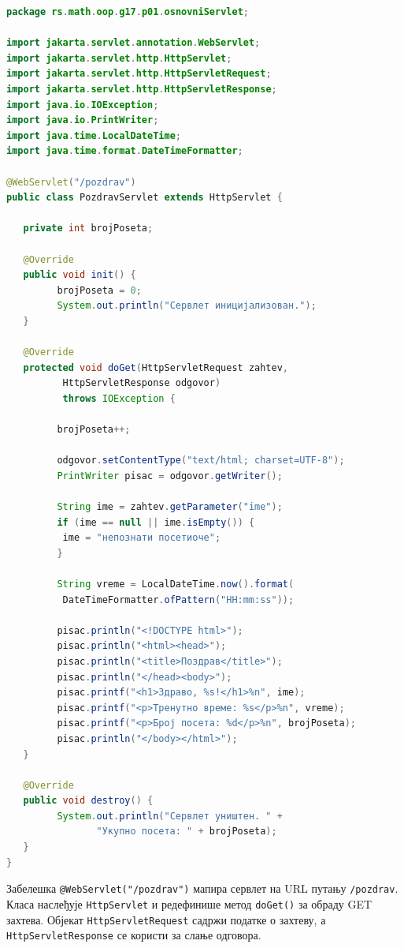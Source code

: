 \begin{lstlisting}[language=Java]
package rs.math.oop.g17.p01.osnovniServlet;
 
import jakarta.servlet.annotation.WebServlet;
import jakarta.servlet.http.HttpServlet;
import jakarta.servlet.http.HttpServletRequest;
import jakarta.servlet.http.HttpServletResponse;
import java.io.IOException;
import java.io.PrintWriter;
import java.time.LocalDateTime;
import java.time.format.DateTimeFormatter;
 
@WebServlet("/pozdrav")
public class PozdravServlet extends HttpServlet {
 
   private int brojPoseta;
 
   @Override
   public void init() {
         brojPoseta = 0;
         System.out.println("Сервлет иницијализован.");
   }
 
   @Override
   protected void doGet(HttpServletRequest zahtev,
          HttpServletResponse odgovor)
          throws IOException {
 
         brojPoseta++;
 
         odgovor.setContentType("text/html; charset=UTF-8");
         PrintWriter pisac = odgovor.getWriter();
 
         String ime = zahtev.getParameter("ime");
         if (ime == null || ime.isEmpty()) {
          ime = "непознати посетиоче";
         }
 
         String vreme = LocalDateTime.now().format(
          DateTimeFormatter.ofPattern("HH:mm:ss"));
 
         pisac.println("<!DOCTYPE html>");
         pisac.println("<html><head>");
         pisac.println("<title>Поздрав</title>");
         pisac.println("</head><body>");
         pisac.printf("<h1>Здраво, %s!</h1>%n", ime);
         pisac.printf("<p>Тренутно време: %s</p>%n", vreme);
         pisac.printf("<p>Број посета: %d</p>%n", brojPoseta);
         pisac.println("</body></html>");
   }
 
   @Override
   public void destroy() {
         System.out.println("Сервлет уништен. " +
                "Укупно посета: " + brojPoseta);
   }
}
\end{lstlisting}


Забелешка \texttt{@WebServlet("/pozdrav")} мапира сервлет на URL путању \texttt{/pozdrav}. Класа наслеђује \texttt{HttpServlet} и редефинише метод \texttt{doGet()} за обраду GET захтева. Објекат \texttt{HttpServletRequest} садржи податке о захтеву, а \texttt{HttpServletResponse} се користи за слање одговора.


